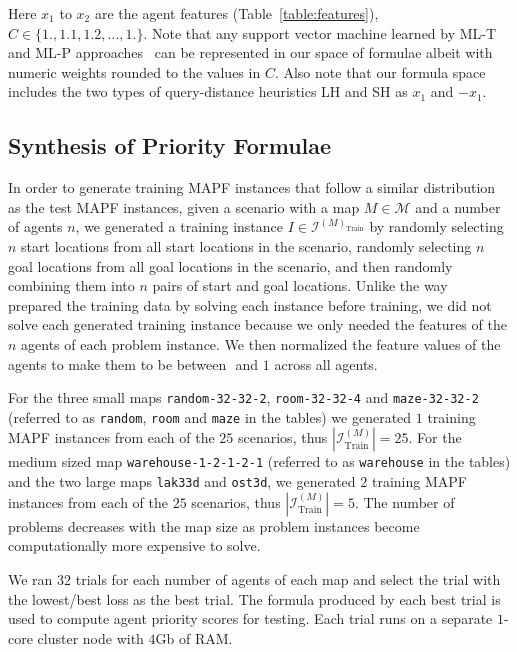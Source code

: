 \documentclass[letterpaper]{article} %
\begin{document}
Here $ x_1 $ to $ x_{2} $ are the agent features (Table~\ref{table:features}), $ C \in \{1., 1.1, 1.2, \dots, 1.\} $. Note that any support vector machine learned by ML-T and ML-P approaches~\citep{zhang222learning} can be represented in our space of formulae albeit with numeric weights rounded to the values in $ C $. Also note that our formula space includes the two types of query-distance heuristics LH and SH as $ x_{1} $ and $ -x_{1} $.

\subsection{Synthesis of Priority Formulae}
\label{synth_pf}

In order to generate training MAPF instances that follow a similar distribution as the test MAPF instances, given a scenario with a map $ M \in \mathcal{M} $ and a number of agents $ n $, we generated a training instance $ I \in \mathcal{I}^{(M)_{\text{Train}}} $ by randomly selecting $ n $ start locations from all start locations in the scenario, randomly selecting $ n $ goal locations from all goal locations in the scenario, and then randomly combining them into $ n $ pairs of start and goal locations. Unlike the way~\citet{zhang222learning} prepared the training data by solving each instance before training, we did not solve each generated training instance because we only needed the features of the $ n $ agents of each problem instance. We then normalized the feature values of the agents to make them to be between $  $ and $ 1 $ across all agents.

For the three small maps {\tt random-32-32-2}, {\tt room-32-32-4} and {\tt maze-32-32-2} (referred to as {\tt random}, {\tt room} and {\tt maze} in the tables) we generated $ 1 $ training MAPF instances from each of the $ 25 $ scenarios, thus $ |\mathcal{I}^{(M)}_{\text{Train}}| = 25 $. For the medium sized map {\tt warehouse-1-2-1-2-1} (referred to as {\tt warehouse} in the tables) and the two large maps {\tt lak33d} and {\tt ost3d}, we generated $ 2 $ training MAPF instances from each of the $ 25 $ scenarios, thus $ |\mathcal{I}^{(M)}_{\text{Train}}| = 5 $. The number of problems decreases with the map size as problem instances become computationally more expensive to solve.

We ran $ 32 $ trials for each number of agents of each map and select the trial with the lowest/best loss as the best trial. The formula produced by each best trial is used to compute agent priority scores for testing. Each trial runs on a separate $ 1 $-core cluster node with $ 4 $Gb of RAM.
\end{document}
